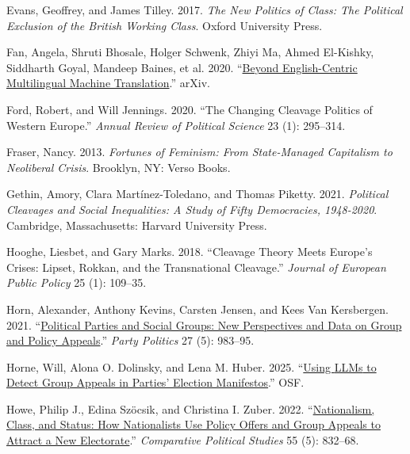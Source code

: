 \documentclass[12pt]{article}
\begin{document}
\begin{CSLReferences}{1}{0}
Evans, Geoffrey, and James Tilley. 2017. \emph{The New Politics of Class: The Political Exclusion of the British Working Class}. Oxford University Press.

Fan, Angela, Shruti Bhosale, Holger Schwenk, Zhiyi Ma, Ahmed El-Kishky, Siddharth Goyal, Mandeep Baines, et al. 2020. {``\href{https://doi.org/10.48550/arXiv.2010.11125}{Beyond English-Centric Multilingual Machine Translation}.''} {arXiv}.

Ford, Robert, and Will Jennings. 2020. {``The Changing Cleavage Politics of Western Europe.''} \emph{Annual Review of Political Science} 23 (1): 295--314.

Fraser, Nancy. 2013. \emph{Fortunes of Feminism: From State-Managed Capitalism to Neoliberal Crisis}. Brooklyn, {NY}: Verso Books.

Gethin, Amory, Clara Martínez-Toledano, and Thomas Piketty. 2021. \emph{Political Cleavages and Social Inequalities: A Study of Fifty Democracies, 1948-2020}. Cambridge, Massachusetts: Harvard University Press.

Hooghe, Liesbet, and Gary Marks. 2018. {``Cleavage Theory Meets Europe's Crises: Lipset, Rokkan, and the Transnational Cleavage.''} \emph{Journal of European Public Policy} 25 (1): 109--35.

Horn, Alexander, Anthony Kevins, Carsten Jensen, and Kees Van Kersbergen. 2021. {``\href{https://doi.org/10.1177/1354068820907998}{Political Parties and Social Groups: New Perspectives and Data on Group and Policy Appeals}.''} \emph{Party Politics} 27 (5): 983--95.

Horne, Will, Alona O. Dolinsky, and Lena M. Huber. 2025. {``\href{https://doi.org/10.31219/osf.io/fp2h3_v2}{Using {LLMs} to Detect Group Appeals in Parties' Election Manifestos}.''} {OSF}.

Howe, Philip J., Edina Szöcsik, and Christina I. Zuber. 2022. {``\href{https://doi.org/10.1177/00104140211036033}{Nationalism, Class, and Status: How Nationalists Use Policy Offers and Group Appeals to Attract a New Electorate}.''} \emph{Comparative Political Studies} 55 (5): 832--68.


\end{CSLReferences}
\end{document}
